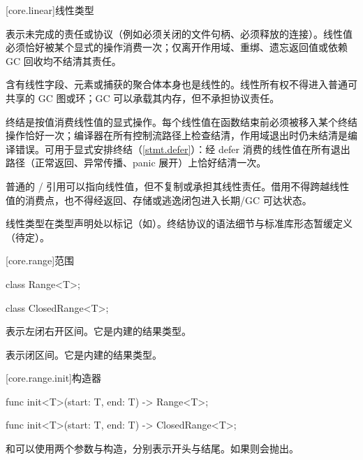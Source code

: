 [core.linear]{线性类型}

\pnum
{}表示未完成的责任或协议（例如必须关闭的文件句柄、必须释放的连接）。线性值必须恰好被某个显式的操作消费一次；仅离开作用域、重绑、遗忘返回值或依赖 GC 回收均不结清其责任。

\pnum
含有线性字段、元素或捕获的聚合体本身也是线性的。线性所有权不得进入普通可共享的 GC 图或环；GC 可以承载其内存，但不承担协议责任。

\pnum
终结是按值消费线性值的显式操作。每个线性值在函数结束前必须被移入某个终结操作恰好一次；编译器在所有控制流路径上检查结清，作用域退出时仍未结清是编译错误。可用于显式安排终结（\ref{stmt.defer}）：经 defer 消费的线性值在所有退出路径（正常返回、异常传播、panic 展开）上恰好结清一次。

\pnum
普通的 / 引用可以指向线性值，但不复制或承担其线性责任。借用不得跨越线性值的消费点，也不得经返回、存储或逃逸闭包进入长期/GC 可达状态。

\pnum
线性类型在类型声明处以标记（如）。终结协议的语法细节与标准库形态暂缓定义（待定）。

[core.range]{范围}

\begin{itemdecl}
class Range<T>;
\end{itemdecl}

\begin{itemdecl}
class ClosedRange<T>;
\end{itemdecl}

\pnum
{}表示左闭右开区间。它是内建的结果类型。

\pnum
{}表示闭区间。它是内建的结果类型。

[core.range.init]{构造器}

\begin{itemdecl}
func init<T>(start: T, end: T) -> Range<T>;
\end{itemdecl}

\begin{itemdecl}
func init<T>(start: T, end: T) -> ClosedRange<T>;
\end{itemdecl}

\pnum
{}和可以使用两个参数与构造，分别表示开头与结尾。如果则会抛出。

